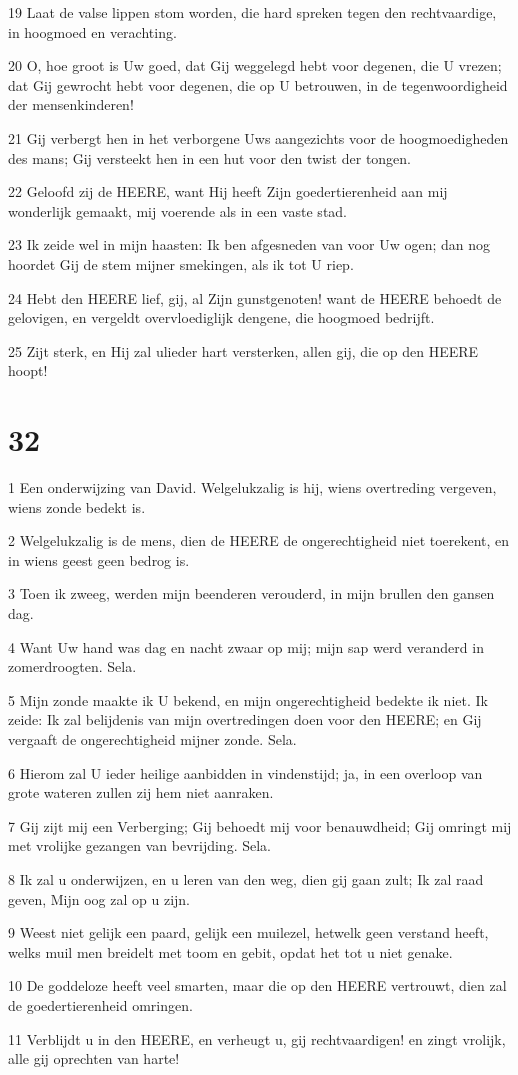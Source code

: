 \par 19 Laat de valse lippen stom worden, die hard spreken tegen den rechtvaardige, in hoogmoed en verachting.
\par 20 O, hoe groot is Uw goed, dat Gij weggelegd hebt voor degenen, die U vrezen; dat Gij gewrocht hebt voor degenen, die op U betrouwen, in de tegenwoordigheid der mensenkinderen!
\par 21 Gij verbergt hen in het verborgene Uws aangezichts voor de hoogmoedigheden des mans; Gij versteekt hen in een hut voor den twist der tongen.
\par 22 Geloofd zij de HEERE, want Hij heeft Zijn goedertierenheid aan mij wonderlijk gemaakt, mij voerende als in een vaste stad.
\par 23 Ik zeide wel in mijn haasten: Ik ben afgesneden van voor Uw ogen; dan nog hoordet Gij de stem mijner smekingen, als ik tot U riep.
\par 24 Hebt den HEERE lief, gij, al Zijn gunstgenoten! want de HEERE behoedt de gelovigen, en vergeldt overvloediglijk dengene, die hoogmoed bedrijft.
\par 25 Zijt sterk, en Hij zal ulieder hart versterken, allen gij, die op den HEERE hoopt!

\chapter{32}

\par 1 Een onderwijzing van David. Welgelukzalig is hij, wiens overtreding vergeven, wiens zonde bedekt is.
\par 2 Welgelukzalig is de mens, dien de HEERE de ongerechtigheid niet toerekent, en in wiens geest geen bedrog is.
\par 3 Toen ik zweeg, werden mijn beenderen verouderd, in mijn brullen den gansen dag.
\par 4 Want Uw hand was dag en nacht zwaar op mij; mijn sap werd veranderd in zomerdroogten. Sela.
\par 5 Mijn zonde maakte ik U bekend, en mijn ongerechtigheid bedekte ik niet. Ik zeide: Ik zal belijdenis van mijn overtredingen doen voor den HEERE; en Gij vergaaft de ongerechtigheid mijner zonde. Sela.
\par 6 Hierom zal U ieder heilige aanbidden in vindenstijd; ja, in een overloop van grote wateren zullen zij hem niet aanraken.
\par 7 Gij zijt mij een Verberging; Gij behoedt mij voor benauwdheid; Gij omringt mij met vrolijke gezangen van bevrijding. Sela.
\par 8 Ik zal u onderwijzen, en u leren van den weg, dien gij gaan zult; Ik zal raad geven, Mijn oog zal op u zijn.
\par 9 Weest niet gelijk een paard, gelijk een muilezel, hetwelk geen verstand heeft, welks muil men breidelt met toom en gebit, opdat het tot u niet genake.
\par 10 De goddeloze heeft veel smarten, maar die op den HEERE vertrouwt, dien zal de goedertierenheid omringen.
\par 11 Verblijdt u in den HEERE, en verheugt u, gij rechtvaardigen! en zingt vrolijk, alle gij oprechten van harte!


